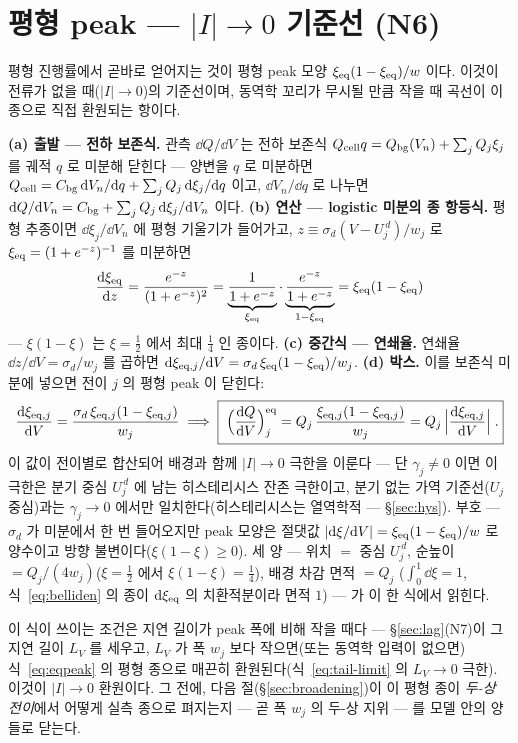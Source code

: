 \section{평형 peak --- $|I|\to0$ 기준선 (N6)}\label{sec:eqpeak}
평형 진행률에서 곧바로 얻어지는 것이 평형 peak 모양 $\xi_{\mathrm{eq}}(1-\xi_{\mathrm{eq}})/w$ 이다. 이것이 전류가 없을 때($|I|\to0$)의
기준선이며, 동역학 꼬리가 무시될 만큼 작을 때 곡선이 이 종으로 직접 환원되는 항이다.

\textbf{(a) 출발 --- 전하 보존식.} 관측 $\dd Q/\dd V$ 는 전하 보존식 $Q_{\mathrm{cell}} q=Q_{\mathrm{bg}}(V_n)+\sum_jQ_j\xi_j$ 를 궤적
$q$ 로 미분해 닫힌다 --- 양변을 $q$ 로 미분하면 $Q_{\mathrm{cell}}=C_{\mathrm{bg}}\,\mathrm{d} V_n/\mathrm{d} q+\sum_jQ_j\,\mathrm{d}\xi_j/\mathrm{d} q$ 이고,
$\dd V_n/\dd q$ 로 나누면 $\mathrm{d} Q/\mathrm{d} V_n=C_{\mathrm{bg}}+\sum_jQ_j\,\mathrm{d}\xi_j/\mathrm{d} V_n$ 이다. \textbf{(b) 연산 --- logistic
미분의 종 항등식.} 평형 추종이면 $\dd\xi_j/\dd V_n$ 에 평형 기울기가 들어가고, $z\equiv\sigma_d(V-U_j^{\,d})/w_j$ 로
$\xi_{\mathrm{eq}}=(1+e^{-z})^{-1}$ 를 미분하면
\begin{equation}
\frac{\mathrm{d}\xi_{\mathrm{eq}}}{\mathrm{d} z}=\frac{e^{-z}}{(1+e^{-z})^2}
=\underbrace{\frac{1}{1+e^{-z}}}_{\xi_{\mathrm{eq}}}\cdot\underbrace{\frac{e^{-z}}{1+e^{-z}}}_{1-\xi_{\mathrm{eq}}}
=\xi_{\mathrm{eq}}(1-\xi_{\mathrm{eq}})
\label{eq:belliden}
\end{equation}
--- $\xi(1-\xi)$ 는 $\xi=\tfrac12$ 에서 최대 $\tfrac14$ 인 종이다. \textbf{(c) 중간식 --- 연쇄율.} 연쇄율
$\dd z/\dd V=\sigma_d/w_j$ 를 곱하면 $\mathrm{d}\xi_{\mathrm{eq},j}/\mathrm{d} V=\sigma_d\,\xi_{\mathrm{eq}}(1-\xi_{\mathrm{eq}})/w_j$. \textbf{(d) 박스.}
이를 보존식 미분에 넣으면 전이 $j$ 의 평형 peak 이 닫힌다:
\begin{equation}
\frac{\mathrm{d}\xi_{\mathrm{eq},j}}{\mathrm{d} V}=\frac{\sigma_d\,\xi_{\mathrm{eq},j}(1-\xi_{\mathrm{eq},j})}{w_j}
\;\Longrightarrow\;
\boxed{\;\Big(\frac{\mathrm{d} Q}{\mathrm{d} V}\Big)^{\mathrm{eq}}_j
=Q_j\,\frac{\xi_{\mathrm{eq},j}(1-\xi_{\mathrm{eq},j})}{w_j}
=Q_j\,\Big|\frac{\mathrm{d}\xi_{\mathrm{eq},j}}{\mathrm{d} V}\Big|\;.}
\label{eq:eqpeak}
\end{equation}
이 값이 전이별로 합산되어 배경과 함께 $|I|\to0$ 극한을 이룬다 --- 단 $\gamma_j\ne0$ 이면 이 극한은 분기
중심 $U_j^{\,d}$ 에 남는 히스테리시스 잔존 극한이고, 분기 없는 가역 기준선($U_j$ 중심)과는
$\gamma_j\to0$ 에서만 일치한다(히스테리시스는 열역학적 --- \S\ref{sec:hys}). 부호 --- $\sigma_d$ 가 미분에서 한 번 들어오지만 peak 모양은
절댓값 $|\mathrm{d}\xi/\mathrm{d} V|=\xi_{\mathrm{eq}}(1-\xi_{\mathrm{eq}})/w$ 로 양수이고 방향 불변이다($\xi(1-\xi)\ge0$). 세 양 --- 위치 $=$ 중심
$U_j^{\,d}$, 순높이 $=Q_j/(4w_j)$($\xi=\tfrac12$ 에서 $\xi(1-\xi)=\tfrac14$), 배경 차감 면적 $=Q_j$
($\int_0^1\dd\xi=1$, 식~\eqref{eq:belliden} 의 종이 $\mathrm{d}\xi_{\mathrm{eq}}$ 의 치환적분이라 면적 $1$) --- 가 이 한 식에서 읽힌다.

이 식이 쓰이는 조건은 지연 길이가 peak 폭에 비해 작을 때다 --- \S\ref{sec:lag}(N7)이 그 지연 길이 $L_V$ 를
세우고, $L_V$ 가 폭 $w_j$
보다 작으면(또는 동역학 입력이 없으면) 식~\eqref{eq:eqpeak} 의 평형 종으로 매끈히 환원된다(식~\eqref{eq:tail-limit} 의 $L_V\to0$ 극한). 이것이 $|I|\to0$ 환원이다.
그 전에, 다음 절(\S\ref{sec:broadening})이 이 평형 종이 \emph{두-상 전이}에서 어떻게 실측 종으로 펴지는지 ---
곧 폭 $w_j$ 의 두-상 지위 --- 를 모델 안의 양들로 닫는다.

